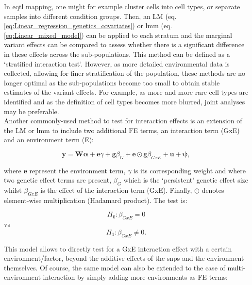 In \gls{eqtl} mapping, one might for example cluster cells into cell types, or separate samples into different condition groups.
Then, an LM (eq. \eqref{eq:Linear_regression_genetics_covariates}) or \gls{lmm} (eq. \eqref{eq:Linear_mixed_model}) can be applied to each stratum and the marginal variant effects can be compared to assess whether there is a significant difference in these effects across the sub-populations.
This method can be defined as a `stratified interaction test'.
However, as more detailed environmental data is collected, allowing for finer stratification of the population, these methods are no longer optimal as the sub-populations become too small to obtain stable estimates of the variant effects.
For example, as more and more rare cell types are identified and as the definition of cell types becomes more blurred, joint analyses may be preferable. \\



Another commonly-used method to test for interaction effects is an extension of the LM or \gls{lmm} to include two additional FE terms, an interaction term (GxE) and an environment term (E):

\begin{equation}\label{eq:Interaction_test_FE_LMM}
 \mathbf{y} =  \mathbf{W}\boldsymbol{\alpha} + \mathbf{e}\gamma  + \mathbf{g}\beta_G + \mathbf{e}\odot\mathbf{g}\beta_{GxE} + \mathbf{u} + \boldsymbol{\psi}, 
\end{equation}

where $\mathbf{e}$ represent the environment term, $\gamma$ is its corresponding weight and where two genetic effect terms are present, $\beta_G$ which is the `persistent' genetic effect size whilst $\beta_{GxE}$ is the effect of the interaction term (GxE).
Finally, $\odot$ denotes element-wise multiplication (Hadamard product).
The test is:

\begin{equation}
 H_{0}: \beta_{GxE}=0 
\end{equation}
vs
\begin{equation}
 H_{1}: \beta_{GxE} \neq 0. 
\end{equation}

This model allows to directly test for a GxE interaction effect with a certain environment/factor, beyond the additive effects of the \gls{snp}s and the environment themselves. 
Of course, the same model can also be extended to the case of multi-environment interaction by simply adding more environments as FE terms:

